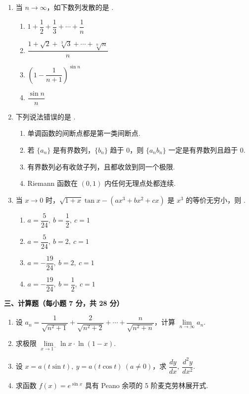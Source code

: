 \documentclass[a4paper,11pt]{ctexart}
\newcommand{\blank}[1][2.6cm]{\underline{\hspace{#1}}}
\begin{document}
\begin{enumerate}[label=\arabic*., leftmargin=2em, itemsep=0.85em, topsep=0.5em]
  \item 当 $n\to\infty$，如下数列发散的是 \blank[1.8cm].
  \begin{enumerate}[label=\Alph*., leftmargin=1.8em, itemsep=0.35em, topsep=0.35em]
    \item $1 + \dfrac{1}{2} + \dfrac{1}{3} + \cdots + \dfrac{1}{n}$
    \item $\dfrac{1 + \sqrt{2} + \sqrt[3]{3} + \cdots + \sqrt[n]{n}}{n}$
    \item $\left(1 - \dfrac{1}{n+1}\right)^{\sin n}$
    \item $\dfrac{\sin n}{n}$
  \end{enumerate}

  \item 下列说法错误的是 \blank[1.8cm].
  \begin{enumerate}[label=\Alph*., leftmargin=1.8em, itemsep=0.3em, topsep=0.35em]
    \item 单调函数的间断点都是第一类间断点.
    \item 若 $\{a_n\}$ 是有界数列，$\{b_n\}$ 趋于 $0$，则 $\{a_n b_n\}$ 一定是有界数列且趋于 $0$.
    \item 有界数列必有收敛子列，且都收敛到同一个极限.
    \item Riemann 函数在 $(0,1)$ 内任何无理点处都连续.
  \end{enumerate}

  \item 当 $x\to 0$ 时，$\sqrt{1+x}\tan x - (ax^3 + bx^2 + cx)$ 是 $x^3$ 的等价无穷小，则 \blank[1.8cm].
  \begin{enumerate}[label=\Alph*., leftmargin=1.8em, itemsep=0.35em, topsep=0.35em]
    \item $a=\dfrac{5}{24},\ b=\dfrac{1}{2},\ c=1$
    \item $a=\dfrac{5}{24},\ b=2,\ c=1$
    \item $a=-\dfrac{19}{24},\ b=2,\ c=1$
    \item $a=-\dfrac{19}{24},\ b=\dfrac{1}{2},\ c=1$
  \end{enumerate}
\end{enumerate}

\vspace{0.8em}
\textbf{三、计算题（每小题 7 分，共 28 分）}

\begin{enumerate}[label=\arabic*., leftmargin=2em, itemsep=0.9em, topsep=0.5em]
  \item 设 $a_n = \dfrac{1}{\sqrt{n^2+1}} + \dfrac{2}{\sqrt{n^2+2}} + \cdots + \dfrac{n}{\sqrt{n^2+n}}$，计算 $\lim\limits_{n\to\infty} a_n$.

  \item 求极限 $\lim\limits_{x\to 1^-} \ln x \cdot \ln(1-x)$.

  \item 设 $x = a(t\sin t),\ y = a(t\cos t)\ (a\neq 0)$，求 $\dfrac{dy}{dx},\ \dfrac{d^2y}{dx^2}$.

  \item 求函数 $f(x) = e^{\sin x}$ 具有 Peano 余项的 5 阶麦克劳林展开式.
\end{enumerate}
\end{document}
